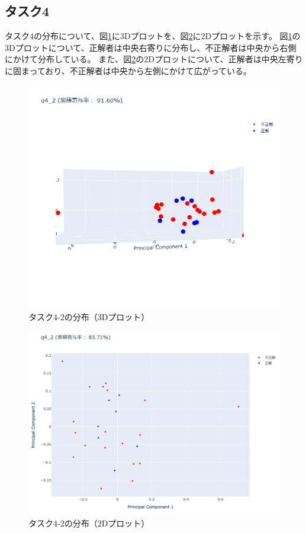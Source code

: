 \documentclass[paper=a4paper,fontsize=11pt]{jlreq}
\begin{document}
    \subsection{タスク4}
      タスク4の分布について、図\ref{3dplot_q4_2}に3Dプロットを、図\ref{2dplot_q4_2}に2Dプロットを示す。
      図\ref{3dplot_q4_2}の3Dプロットについて、正解者は中央右寄りに分布し、不正解者は中央から右側にかけて分布している。
      また、図\ref{2dplot_q4_2}の2Dプロットについて、正解者は中央左寄りに固まっており、不正解者は中央から左側にかけて広がっている。
      \begin{figure}[htbp]
        \centering
        \includegraphics[width=0.8\linewidth]{3dplot_q4_2.png}
        \caption{タスク4-2の分布（3Dプロット）}
        \label{3dplot_q4_2}
      \end{figure}
      \FloatBarrier
      \begin{figure}[htbp]
        \centering
        \includegraphics[width=\linewidth]{2dplot_q4_2.jpg}
        \caption{タスク4-2の分布（2Dプロット）}
        \label{2dplot_q4_2}
      \end{figure}
      \FloatBarrier
      \pagebreak
\end{document}
